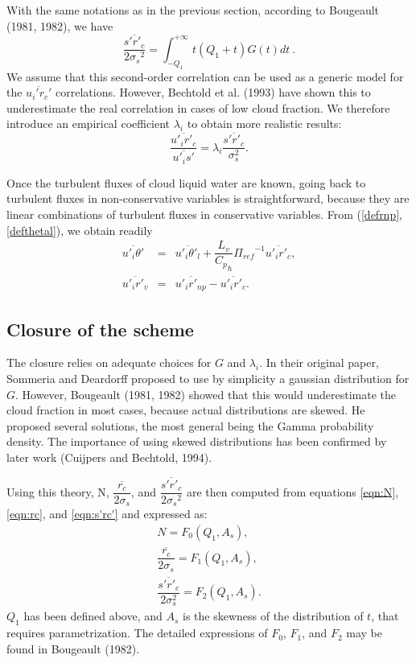 With the same notations as in the previous section, according to
Bougeault (1981, 1982), we have
\begin{equation}\label{eqn:s'rc'}
\dfrac{\overline{{s'}{r'_{c}}}}{2{{\sigma}_{s}}^2} =
\int_{-Q_{1}}^{+\infty} t(Q_{1}+t)G(t) dt~.
\end{equation}
We assume that this second-order correlation can be used as a generic model
for the $\overline{u_i' r_c'}$ correlations. However, Bechtold et al. (1993)
have shown this to underestimate the real correlation in cases of low cloud
fraction. We therefore introduce an empirical coefficient $\lambda_i$ to
obtain more realistic results:
\begin{equation}\label{eqn:key}
\dfrac{\overline{u'_i r'_c}}{\overline{u'_i s'}} =
\lambda_i \dfrac{\overline{s' r'_c}}{\sigma_s^2}.
\end{equation}

\smallskip
Once the turbulent fluxes of cloud liquid water are known,
 going back to turbulent
fluxes in non-conservative variables is straightforward, because they are
linear combinations of turbulent fluxes in conservative variables.  From
(\ref{defrnp}, \ref{defthetal}), we obtain readily
\begin{eqnarray}
\overline{{u'_{i}}{{\theta}'}} &=&\overline{{u'_{i}}{{\theta}'_{l}}}  +
\dfrac{L_{v}}{{C_{p}}_{h}}{{\Pi}_{ref}}^{-1} \overline{{u'_{i}}{r'_{c}}}, \\
\overline{{u'_{i}}{r'_{v}}}&=&\overline{{u'_{i}}{r'_{np}}}  -
\overline{{u'_{i}}{r'_{c}}}.
\end{eqnarray}

\subsection{Closure of the scheme}

The closure relies on adequate choices for $G$ and $\lambda_i$.
In their original paper, Sommeria and Deardorff proposed to use by simplicity
a gaussian distribution for $G$. However, Bougeault (1981, 1982) showed
that this would underestimate the cloud fraction in most cases, because
actual distributions are skewed. He proposed several solutions, the
most general being the Gamma probability density. The importance of using
skewed distributions has been confirmed by later work (Cuijpers and
Bechtold, 1994).


Using this theory, N, $\dfrac{\overline{r_{c}}}{2{\sigma}_{s}}$, and
$\dfrac{\overline{{s'}{r'_{c}}}}{2{{\sigma}_{s}}^2}$ are then computed from
equations \ref{eqn:N}, \ref{eqn:rc}, and \ref{eqn:s'rc'} and expressed as:
\begin{eqnarray}
\label{eqn:NF0} N = F_0(Q_1,A_s), \\
\label{eqn:rcF1} \dfrac{\overline{r_c}}{2\sigma_s}=F_1(Q_1,A_s),\\
\label{eqn:s'rc'F2} \dfrac{\overline{s'r'_c}}{2\sigma_s^2}=F_2(Q_1,A_s).
\end{eqnarray}
$Q_1$ has been defined above, and $A_s$ is the skewness of the distribution
of $t$, that requires parametrization.
The detailed expressions of $F_0$, $F_1$, and $F_2$ may be found in Bougeault
(1982).

